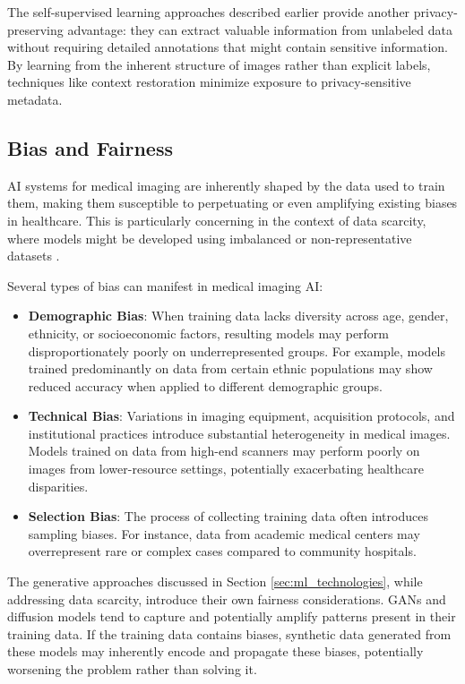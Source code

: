\documentclass{article}
\begin{document}
The self-supervised learning approaches described earlier provide another privacy-preserving advantage: they can extract valuable information from unlabeled data without requiring detailed annotations that might contain sensitive information. By learning from the inherent structure of images rather than explicit labels, techniques like context restoration minimize exposure to privacy-sensitive metadata.

\subsection{Bias and Fairness}
AI systems for medical imaging are inherently shaped by the data used to train them, making them susceptible to perpetuating or even amplifying existing biases in healthcare. This is particularly concerning in the context of data scarcity, where models might be developed using imbalanced or non-representative datasets \cite{koetzierGeneratingSyntheticData2024}.

Several types of bias can manifest in medical imaging AI:

\begin{itemize}
    \item \textbf{Demographic Bias}: When training data lacks diversity across age, gender, ethnicity, or socioeconomic factors, resulting models may perform disproportionately poorly on underrepresented groups. For example, models trained predominantly on data from certain ethnic populations may show reduced accuracy when applied to different demographic groups.
    
    \item \textbf{Technical Bias}: Variations in imaging equipment, acquisition protocols, and institutional practices introduce substantial heterogeneity in medical images. Models trained on data from high-end scanners may perform poorly on images from lower-resource settings, potentially exacerbating healthcare disparities.
    
    \item \textbf{Selection Bias}: The process of collecting training data often introduces sampling biases. For instance, data from academic medical centers may overrepresent rare or complex cases compared to community hospitals.
\end{itemize}

The generative approaches discussed in Section \ref{sec:ml_technologies}, while addressing data scarcity, introduce their own fairness considerations. GANs and diffusion models tend to capture and potentially amplify patterns present in their training data. If the training data contains biases, synthetic data generated from these models may inherently encode and propagate these biases, potentially worsening the problem rather than solving it.
\end{document}
